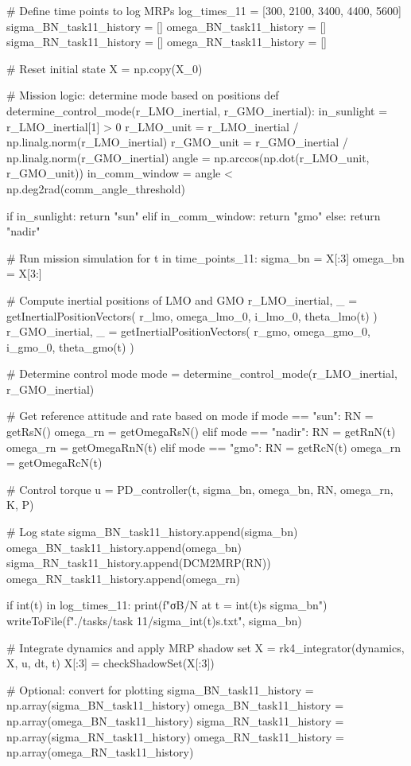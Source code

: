 \documentclass[conf]{new-aiaa}
\begin{document}
\begin{pythoncode}
# Define time points to log MRPs
log_times_11 = [300, 2100, 3400, 4400, 5600]
sigma_BN_task11_history = []
omega_BN_task11_history = []
sigma_RN_task11_history = []
omega_RN_task11_history = []

# Reset initial state
X = np.copy(X_0)


# Mission logic: determine mode based on positions
def determine_control_mode(r_LMO_inertial, r_GMO_inertial):
    in_sunlight = r_LMO_inertial[1] > 0
    r_LMO_unit = r_LMO_inertial / np.linalg.norm(r_LMO_inertial)
    r_GMO_unit = r_GMO_inertial / np.linalg.norm(r_GMO_inertial)
    angle = np.arccos(np.dot(r_LMO_unit, r_GMO_unit))
    in_comm_window = angle < np.deg2rad(comm_angle_threshold)

    if in_sunlight:
        return "sun"
    elif in_comm_window:
        return "gmo"
    else:
        return "nadir"


# Run mission simulation
for t in time_points_11:
    sigma_bn = X[:3]
    omega_bn = X[3:]

    # Compute inertial positions of LMO and GMO
    r_LMO_inertial, _ = getInertialPositionVectors(
        r_lmo, omega_lmo_0, i_lmo_0, theta_lmo(t)
    )
    r_GMO_inertial, _ = getInertialPositionVectors(
        r_gmo, omega_gmo_0, i_gmo_0, theta_gmo(t)
    )

    # Determine control mode
    mode = determine_control_mode(r_LMO_inertial, r_GMO_inertial)

    # Get reference attitude and rate based on mode
    if mode == "sun":
        RN = getRsN()
        omega_rn = getOmegaRsN()
    elif mode == "nadir":
        RN = getRnN(t)
        omega_rn = getOmegaRnN(t)
    elif mode == "gmo":
        RN = getRcN(t)
        omega_rn = getOmegaRcN(t)

    # Control torque
    u = PD_controller(t, sigma_bn, omega_bn, RN, omega_rn, K, P)

    # Log state
    sigma_BN_task11_history.append(sigma_bn)
    omega_BN_task11_history.append(omega_bn)
    sigma_RN_task11_history.append(DCM2MRP(RN))
    omega_RN_task11_history.append(omega_rn)

    if int(t) in log_times_11:
        print(f"σB/N at t = {int(t)}s {sigma_bn}")
        writeToFile(f"./tasks/task 11/sigma_{int(t)}s.txt", sigma_bn)

    # Integrate dynamics and apply MRP shadow set
    X = rk4_integrator(dynamics, X, u, dt, t)
    X[:3] = checkShadowSet(X[:3])

# Optional: convert for plotting
sigma_BN_task11_history = np.array(sigma_BN_task11_history)
omega_BN_task11_history = np.array(omega_BN_task11_history)
sigma_RN_task11_history = np.array(sigma_RN_task11_history)
omega_RN_task11_history = np.array(omega_RN_task11_history)


\end{pythoncode}
\end{document}
